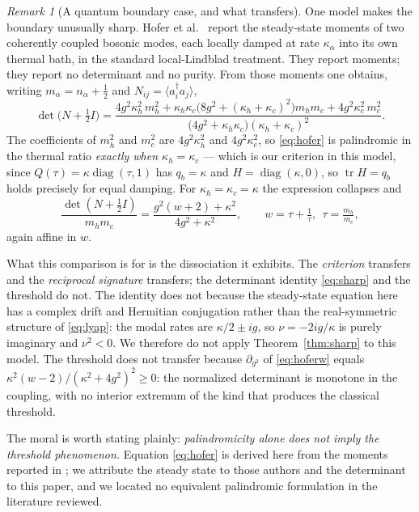 \documentclass[11pt]{article}
\theoremstyle{plain}
\theoremstyle{definition}
\theoremstyle{remark}
\newtheorem{remark}[theorem]{Remark}
\newcommand{\tr}{\operatorname{tr}}
\begin{document}
\begin{remark}[A quantum boundary case, and what transfers]\label{rem:hofer}
One model makes the boundary unusually sharp. Hofer et al.\ \cite{HoferEtAl2017} report the
steady-state moments of two coherently coupled bosonic modes, each locally damped at rate
$\kappa_\alpha$ into its own thermal bath, in the standard local-Lindblad treatment. They report
moments; they report no determinant and no purity. From those moments one obtains, writing
$m_\alpha=n_\alpha+\tfrac12$ and $N_{ij}=\langle a_i^{\dagger}a_j\rangle$,
\begin{equation}
  \det\bigl(N+\tfrac12I\bigr)
  =\frac{4g^2\kappa_h^2\,m_h^2+\kappa_h\kappa_c\bigl(8g^2+(\kappa_h+\kappa_c)^2\bigr)m_hm_c
         +4g^2\kappa_c^2\,m_c^2}{\bigl(4g^2+\kappa_h\kappa_c\bigr)(\kappa_h+\kappa_c)^2}.
  \label{eq:hofer}
\end{equation}
The coefficients of $m_h^2$ and $m_c^2$ are $4g^2\kappa_h^2$ and $4g^2\kappa_c^2$, so
\eqref{eq:hofer} is palindromic in the thermal ratio \emph{exactly when $\kappa_h=\kappa_c$} ---
which is our criterion in this model, since $Q(\tau)=\kappa\operatorname{diag}(\tau,1)$ has
$q_b=\kappa$ and $H=\operatorname{diag}(\kappa,0)$, so $\tr H=q_b$ holds precisely for equal
damping. For $\kappa_h=\kappa_c=\kappa$ the expression collapses and
\begin{equation}
  \frac{\det(N+\tfrac12I)}{m_hm_c}=\frac{g^2(w+2)+\kappa^2}{4g^2+\kappa^2},
  \qquad w=\tau+\tfrac1\tau,\ \ \tau=\tfrac{m_h}{m_c}, \label{eq:hoferw}
\end{equation}
again affine in $w$.

What this comparison is for is the dissociation it exhibits. The \emph{criterion} transfers and
the \emph{reciprocal signature} transfers; the determinant identity \eqref{eq:sharp} and the
threshold do not. The identity does not because the steady-state equation here has a complex
drift and Hermitian conjugation rather than the real-symmetric structure of \eqref{eq:lyap}: the
modal rates are $\kappa/2\pm ig$, so $\nu=-2ig/\kappa$ is purely imaginary and $\nu^2<0$. We
therefore do not apply Theorem~\ref{thm:sharp} to this model. The threshold does not transfer
because $\partial_{g^2}$ of \eqref{eq:hoferw} equals $\kappa^2(w-2)/(\kappa^2+4g^2)^2\ge0$: the
normalized determinant is monotone in the coupling, with no interior extremum of the kind that
produces the classical threshold.

The moral is worth stating plainly: \emph{palindromicity alone does not imply the threshold
phenomenon.} Equation \eqref{eq:hofer} is derived here from the moments reported in
\cite{HoferEtAl2017}; we attribute the steady state to those authors and the determinant to this
paper, and we located no equivalent palindromic formulation in the literature reviewed.
\end{remark}
\end{document}
